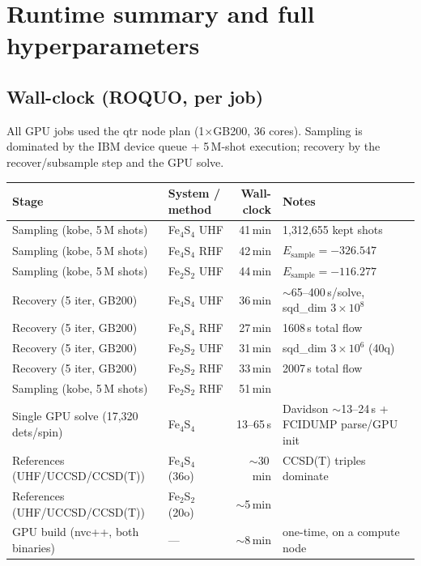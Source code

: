 \documentclass[11pt]{article}
\begin{document}
\section{Runtime summary and full hyperparameters}
\subsection{Wall-clock (ROQUO, per job)}
All GPU jobs used the qtr node plan (1$\times$GB200, 36 cores). Sampling is dominated by the
IBM device queue + 5\,M-shot execution; recovery by the recover/subsample step and the GPU solve.
\begin{longtable}{@{}llrl@{}}
\toprule
Stage & System / method & Wall-clock & Notes \\
\midrule\endhead
Sampling (kobe, 5\,M shots) & Fe$_4$S$_4$ UHF & 41\,min & 1{,}312{,}655 kept shots \\
Sampling (kobe, 5\,M shots) & Fe$_4$S$_4$ RHF & 42\,min & $E_{\text{sample}}=-326.547$ \\
Sampling (kobe, 5\,M shots) & Fe$_2$S$_2$ UHF & 44\,min & $E_{\text{sample}}=-116.277$ \\
Recovery (5 iter, GB200)    & Fe$_4$S$_4$ UHF & 36\,min & $\sim$65--400\,s/solve, sqd\_dim $3\times10^8$ \\
Recovery (5 iter, GB200)    & Fe$_4$S$_4$ RHF & 27\,min & 1608\,s total flow \\
Recovery (5 iter, GB200)    & Fe$_2$S$_2$ UHF & 31\,min & sqd\_dim $3\times10^6$ (40q) \\
Recovery (5 iter, GB200)    & Fe$_2$S$_2$ RHF & 33\,min & 2007\,s total flow \\
Sampling (kobe, 5\,M shots) & Fe$_2$S$_2$ RHF & 51\,min & \\
Single GPU solve (17{,}320 dets/spin) & Fe$_4$S$_4$ & 13--65\,s & Davidson $\sim$13--24\,s + FCIDUMP parse/GPU init \\
References (UHF/UCCSD/CCSD(T)) & Fe$_4$S$_4$ (36o) & $\sim$30\,min & CCSD(T) triples dominate \\
References (UHF/UCCSD/CCSD(T)) & Fe$_2$S$_2$ (20o) & $\sim$5\,min & \\
GPU build (nvc++, both binaries) & --- & $\sim$8\,min & one-time, on a compute node \\
\bottomrule
\end{longtable}
\end{document}
